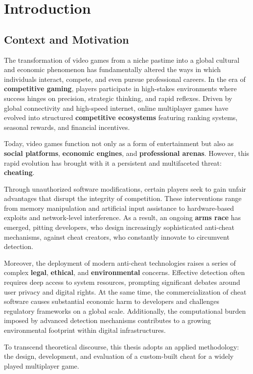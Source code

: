 \chapter{Introduction}

\section*{Context and Motivation}

The transformation of video games from a niche pastime into a global cultural and economic phenomenon has fundamentally altered the ways in which individuals interact, compete, and even pursue professional careers. In the era of \textbf{competitive gaming}, players participate in high-stakes environments where success hinges on precision, strategic thinking, and rapid reflexes. Driven by global connectivity and high-speed internet, online multiplayer games have evolved into structured \textbf{competitive ecosystems} featuring ranking systems, seasonal rewards, and financial incentives.

Today, video games function not only as a form of entertainment but also as \textbf{social platforms}, \textbf{economic engines}, and \textbf{professional arenas}. However, this rapid evolution has brought with it a persistent and multifaceted threat: \textbf{cheating}.

Through unauthorized software modifications, certain players seek to gain unfair advantages that disrupt the integrity of competition. These interventions range from memory manipulation and artificial input assistance to hardware-based exploits and network-level interference. As a result, an ongoing \textbf{arms race} has emerged, pitting developers, who design increasingly sophisticated anti-cheat mechanisms, against cheat creators, who constantly innovate to circumvent detection.

Moreover, the deployment of modern anti-cheat technologies raises a series of complex \textbf{legal}, \textbf{ethical}, and \textbf{environmental} concerns. Effective detection often requires deep access to system resources, prompting significant debates around user privacy and digital rights. At the same time, the commercialization of cheat software causes substantial economic harm to developers and challenges regulatory frameworks on a global scale. Additionally, the computational burden imposed by advanced detection mechanisms contributes to a growing environmental footprint within digital infrastructures.

To transcend theoretical discourse, this thesis adopts an applied methodology: the design, development, and evaluation of a custom-built cheat for a widely played multiplayer game. 


